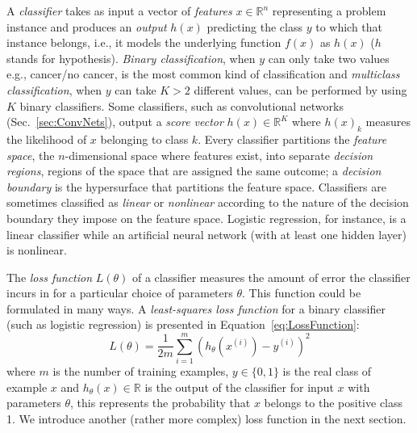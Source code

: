 A \emph{classifier} takes as input a vector of \emph{features} $x \in \mathbb{R}^n$ representing a problem instance and produces an \emph{output} $h(x)$ predicting the class $y$ to which that instance belongs, i.e., it models the underlying function $f(x)$ as $h(x)$ ($h$ stands for hypothesis). \emph{Binary classification}, when $y$ can only take two values e.g., cancer/no cancer, is the most common kind of classification and \emph{multiclass classification}, when $y$ can take $K > 2$ different values, can be performed by using $K$ binary classifiers. Some classifiers, such as convolutional networks (Sec.~\ref{sec:ConvNets}), output a \emph{score vector} $h(x) \in \mathbb{R}^K$ where $h(x)_k$ measures the likelihood of $x$ belonging to class $k$. Every classifier partitions the \emph{feature space}, the $n$-dimensional space where features exist, into separate \emph{decision regions}, regions of the space that are assigned the same outcome; a \emph{decision boundary} is the hypersurface that partitions the feature space. Classifiers are sometimes classified as \emph{linear} or \emph{nonlinear} according to the nature of the decision boundary they impose on the feature space. Logistic regression, for instance, is a linear classifier while an artificial neural network (with at least one hidden layer) is nonlinear.

The \emph{loss function} $L(\theta)$ of a classifier measures the amount of error the classifier incurs in for a particular choice of parameters $\theta$. This function could be formulated in many ways. A \emph{least-squares loss function} for a binary classifier (such as logistic regression) is presented in Equation~\ref{eq:LossFunction}:
\begin{equation}
	L(\theta) = \frac{1}{2m}\sum_{i=1}^m(h_\theta(x^{(i)}) - y^{(i)})^2
	\label{eq:LossFunction}
\end{equation}
where $m$ is the number of training examples, $y \in \{0,1\}$ is the real class of example $x$ and $h_\theta(x) \in \mathbb{R}$ is the output of the classifier for input $x$ with parameters $\theta$, this represents the probability that $x$ belongs to the positive class 1. We introduce another (rather more complex) loss function in the next section.

